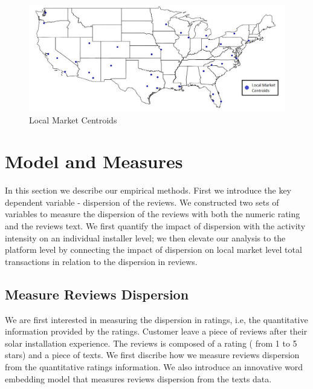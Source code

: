 \documentclass[msom,blindrev]{informs3}
\begin{document}
\begin{figure}
	\centering
	\includegraphics[width=1\linewidth]{markets.jpg}
	\caption{Local Market Centroids}
	\label{fig:markets}
\end{figure}


\section{Model and Measures}
In this section we describe our empirical methods. First we introduce the key dependent variable - dispersion of the reviews. We constructed two sets of variables to measure the dispersion of the reviews with both the numeric rating and the reviews text. We first quantify the impact of dispersion with the activity intensity on an individual installer level; we then elevate our analysis to the platform level by connecting the impact of dispersion on local market level total transactions in relation to the dispersion in reviews.

\subsection{Measure Reviews Dispersion}
\label{subsection_measure_dispersion}
We are first interested in measuring the dispersion in ratings, i.e, the quantitative information provided by the ratings. Customer leave a piece of reviews after their solar installation experience. The reviews is composed of a rating ( from 1 to 5 stars) and a piece of texts. We first discribe how we measure reviews dispersion from the quantitative ratings information. We also introduce an innovative word embedding model that measures reviews dispersion from the texts data.
\end{document}
